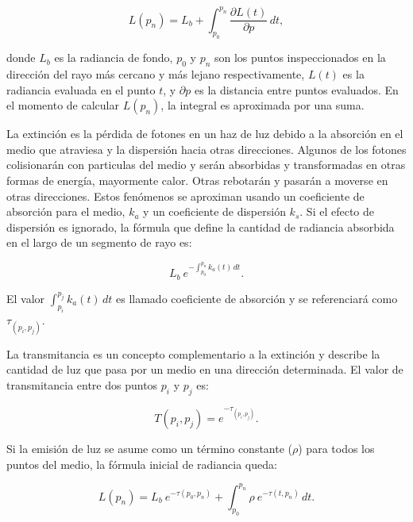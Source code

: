 \documentclass[oneside,a4paper,spanish,links]{amca}
\begin{document}
\begin{equation} \label{eq:general_radiance}  
  L(p_n) = L_b + \int_{p_0}^{p_n} \frac{\partial L(t)}{\partial p} \, dt,
\end{equation}

\noindent donde $L_b$ es la radiancia de fondo, $p_0$ y $p_n$ son los
puntos inspeccionados en la dirección del rayo más cercano y más
lejano respectivamente, $L(t)$ es la radiancia evaluada en el punto
$t$, y $\partial p$ es la distancia entre puntos evaluados. En el
momento de calcular $L(p_n)$, la integral es aproximada por una suma.

La extinción es la pérdida de fotones en un haz de luz debido a la
absorción en el medio que atraviesa y la dispersión hacia otras
direcciones. Algunos de los fotones colisionarán con particulas del
medio y serán absorbidas y transformadas en otras formas de energía,
mayormente calor. Otras rebotarán y pasarán a moverse en otras
direcciones. Estos fenómenos se aproximan usando un coeficiente de
absorción para el medio, $k_a$ y un coeficiente de dispersión
$k_s$. Si el efecto de dispersión es ignorado, la fórmula que define
la cantidad de radiancia absorbida en el largo de un segmento de rayo
es: 

\begin{equation} \label{eq:radiance_absorption}  
    L_b \ e^{- \textstyle  \int_{p_0}^{p_n} k_a(t) \, dt}.
\end{equation}

El valor $\int_{p_i}^{p_j} k_a(t) \, dt$ es llamado coeficiente de
absorción y se referenciar\'a como $\tau_{(p_i, p_j)}$.

La transmitancia es un concepto complementario a la extinción y
describe la cantidad de luz que pasa por un medio en una dirección
determinada. El valor de transmitancia entre dos puntos $p_i$ y $p_j$
es:

\begin{equation} \label{eq:general_radiance}  
  T(p_i,p_j) = e^{- \textstyle \tau_{(p_i, p_j)}}.
\end{equation}

Si la emisión de luz se asume como un término constante ($\rho$) para
todos los puntos del medio, la fórmula inicial de radiancia queda:

\begin{equation} \label{eq:ray_radiance}  
  L(p_n) = L_b \ e^{-\tau(p_0, p_n)} + \int_{p_0}^{p_n} \rho \ e^{-\tau(t,p_n)} \, dt.
\end{equation}
\end{document}
